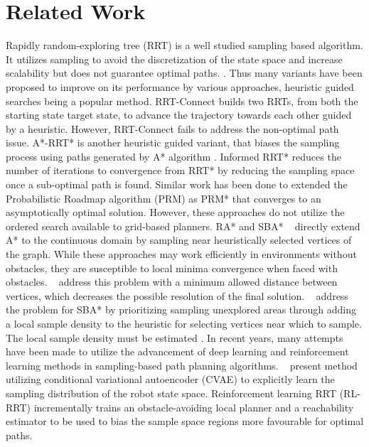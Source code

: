 \documentclass{article}
\begin{document}

\section{Related Work}
\label{sec:Related Work}
    Rapidly random-exploring tree (RRT) \cite{rrt} is a well studied sampling based algorithm. It utilizes sampling to avoid the discretization of the state space and increase scalability but does not guarantee optimal paths. \cite{rrt*}. Thus many variants have been proposed to improve on its performance by various approaches, heuristic guided searches being a popular method. RRT-Connect \cite{RRTConnect} builds two RRTs, from both the starting state target state, to advance the trajectory towards each other guided by a heuristic. However, RRT-Connect fails to address the non-optimal path issue. A*-RRT* \cite{arrt} is another heuristic guided variant, that biases the sampling process using paths generated by A* algorithm \cite{astar}. Informed RRT* \cite{irrt} reduces the number of iterations to convergence from RRT* by reducing the sampling space once a sub-optimal path is found. Similar work has been done to extended the Probabilistic Roadmap algorithm (PRM) as PRM* \cite{rrt*} that converges to an asymptotically optimal solution. However, these approaches do not utilize the ordered search available to grid-based planners. RA* \citep{RA*} and SBA* ~\citep{SBA*} directly extend A* to the continuous domain by sampling near heuristically selected vertices of the graph. While these approaches may work efficiently in environments without obstacles, they are susceptible to local minima convergence when faced with obstacles. ~\citet{RA*} address this problem with a minimum allowed distance between vertices, which decreases the possible resolution of the final solution. ~\citet{SBA*} address the problem for SBA* by prioritizing sampling unexplored areas through adding a local sample density to the heuristic for selecting vertices near which to sample. The local sample density must be estimated \cite{BIT*}. In recent years, many attempts have been made to utilize the advancement of deep learning and reinforcement learning methods in sampling-based path planning algorithms. ~\citet{cvae} present method utilizing conditional variational autoencoder (CVAE) to explicitly learn the sampling distribution of the robot state space. Reinforcement learning RRT (RL-RRT) \cite{rlrrt} incrementally trains an obstacle-avoiding local planner and a reachability estimator to be used to bias the sample space regions more favourable for optimal paths. 
    
\end{document}
